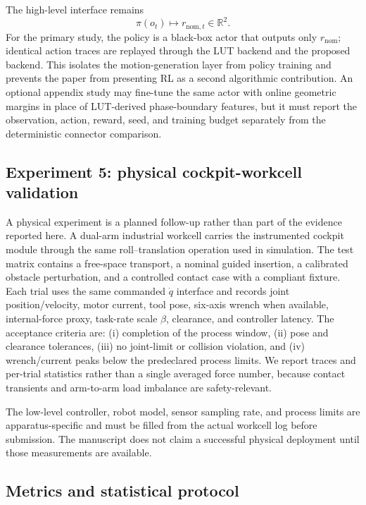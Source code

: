\documentclass[preprint,12pt]{elsarticle}
\newcommand{\R}{\mathbb{R}}
\begin{document}
The high-level interface remains
\begin{equation}
\pi(o_t)\mapsto r_{\mathrm{nom},t}\in\R^2.
\end{equation}
For the primary study, the policy is a black-box actor that outputs only $r_{\mathrm{nom}}$; identical action traces are replayed through the LUT backend and the proposed backend. This isolates the motion-generation layer from policy training and prevents the paper from presenting RL as a second algorithmic contribution. An optional appendix study may fine-tune the same actor with online geometric margins in place of LUT-derived phase-boundary features, but it must report the observation, action, reward, seed, and training budget separately from the deterministic connector comparison.

\subsection{Experiment 5: physical cockpit-workcell validation}

A physical experiment is a planned follow-up rather than part of the evidence reported here. A dual-arm industrial workcell carries the instrumented cockpit module through the same roll--translation operation used in simulation. The test matrix contains a free-space transport, a nominal guided insertion, a calibrated obstacle perturbation, and a controlled contact case with a compliant fixture. Each trial uses the same commanded $\dot q$ interface and records joint position/velocity, motor current, tool pose, six-axis wrench when available, internal-force proxy, task-rate scale $\beta$, clearance, and controller latency. The acceptance criteria are: (i) completion of the process window, (ii) pose and clearance tolerances, (iii) no joint-limit or collision violation, and (iv) wrench/current peaks below the predeclared process limits. We report traces and per-trial statistics rather than a single averaged force number, because contact transients and arm-to-arm load imbalance are safety-relevant.

The low-level controller, robot model, sensor sampling rate, and process limits are apparatus-specific and must be filled from the actual workcell log before submission. The manuscript does not claim a successful physical deployment until those measurements are available.

\subsection{Metrics and statistical protocol}
\end{document}
